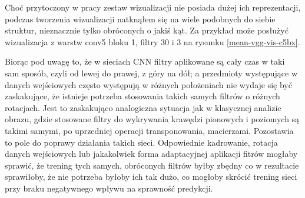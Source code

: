 Choć przytoczony w pracy zestaw wizualizacji nie posiada dużej ich reprezentacji, podczas tworzenia wizualizacji natknąłem się na wiele podobnych do siebie struktur, nieznacznie tylko obróconych o jakiś kąt. Za przykład może posłużyć wizualizacja z warstw conv5 bloku 1, filtry 30 i 3 na rysunku \ref{mean-vgg-vis-c5bx}.

Biorąc pod uwagę to, że w sieciach CNN filtry aplikowane są cały czas w taki sam sposób, czyli od lewej do prawej, z góry na dół; a przedmioty występujące w danych wejściowych często występują w różnych położeniach nie wydaje się być zaskakujące, że istnieje potrzeba stosowania takich samych filtrów o różnych rotacjach. 
Jest to zaskakująco analogiczna sytuacja jak w klasycznej analizie obrazu, gdzie stosowane filtry do wykrywania krawędzi pionowych i poziomych są takimi samymi, po uprzedniej operacji transponowania, macierzami.
Pozostawia to pole do poprawy działania takich sieci. Odpowiednie kadrowanie, rotacja danych wejściowych lub jakakolwiek forma adaptacyjnej aplikacji fitrów mogłaby sprawić, że trening tych samych, obróconych filtrów byłby zbędny co w rezultacie sprawiłoby, że nie potrzeba byłoby ich tak dużo, co mogłoby skrócić trening sieci przy braku negatywnego wpływu na sprawność predykcji.

